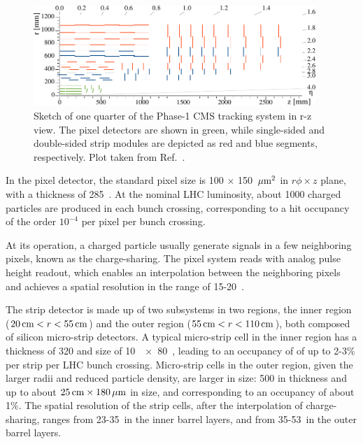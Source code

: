 \begin{figure}[!htb]
    \centering
    \captionsetup{justification=justified}
    \includegraphics[width=0.95\textwidth]{pics/LHC_CMS/Phase1_Tracker.pdf}
    \caption{Sketch of one quarter of the Phase-1 CMS tracking system in r-z view.
             The pixel detectors are shown in green, 
             while single-sided and double-sided strip modules are depicted as red and blue segments, respectively.
             Plot taken from Ref.~\cite{phase1_tracker}.}
    \label{fig:cms_tracker}
\end{figure}

In the pixel detector, the standard pixel size is 100 $\times$ 150 $\,\mu\text{m}^{2}$ in $r\phi \times z$ plane, with a thickness of 285~\mum.
At the nominal LHC luminosity, about 1000 charged particles are produced in each bunch crossing, 
corresponding to a hit occupancy of the order $10^{-4}$ per pixel per bunch crossing.

At its operation, a charged particle usually generate signals in a few neighboring pixels, known as the charge-sharing.
The pixel system reads with analog pulse height readout, which enables an interpolation between the neighboring pixels
and achieves a spatial resolution in the range of 15-20~\mum.

The strip detector is made up of two subsystems in two regions, the inner region ($20 \,\text{cm} < r < 55 \,\text{cm}$) 
and the outer region ($55 \,\text{cm} < r < 110 \,\text{cm}$), both composed of silicon micro-strip detectors. 
A typical micro-strip cell in the inner region has a thickness of 320 \mum and size of 10~\cm~$\times$~80~\mum,
leading to an occupancy of of up to 2-3\% per strip per LHC bunch crossing.
Micro-strip cells in the outer region, given the larger radii and reduced particle density, are larger in size:
500 \mum in thickness and up to about $25 \,\text{cm} \times 180 \,\mu\text{m}$ in size,
and corresponding to an occupancy of about 1\%.
The spatial resolution of the strip cells, after the interpolation of charge-sharing, 
ranges from 23-35~\mum in the inner barrel layers, and from 35-53~\mum in the outer barrel layers.  

